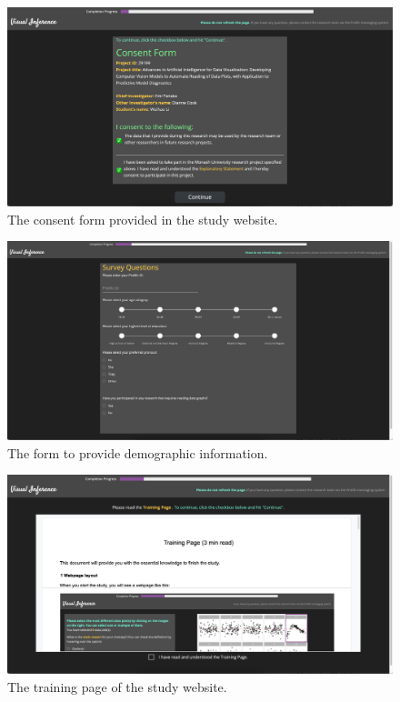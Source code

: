 \documentclass[]{interact}
\theoremstyle{plain}%
\theoremstyle{definition}
\theoremstyle{remark}
\begin{document}
\begin{figure}

{\centering \includegraphics[width=1\linewidth]{figures/consent_form} 

}

\caption{The consent form provided in the study website.}\label{fig:consent-form}
\end{figure}

\begin{figure}

{\centering \includegraphics[width=1\linewidth]{figures/metadata} 

}

\caption{The form to provide demographic information.}\label{fig:metadata}
\end{figure}

\begin{figure}

{\centering \includegraphics[width=1\linewidth]{figures/training} 

}

\caption{The training page of the study website.}\label{fig:training-page}
\end{figure}
\end{document}
